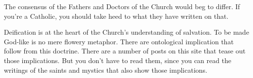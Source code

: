 \begin{footnotesize}
\begin{sffamily}
The consensus of the Fathers and Doctors of the Church would beg to differ. If you're a Catholic, you should take heed to what they have written on that.

Deification is at the heart of the Church's understanding of salvation. To be made God-like is no mere flowery metaphor. There are ontological implication that follow from this doctrine. There are a number of posts on this site that tease out those implications. But you don't have to read them, since you can read the writings of the saints and mystics that also show those implications.


\end{sffamily}\end{footnotesize}
